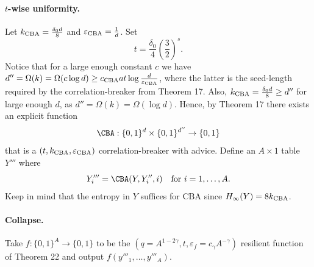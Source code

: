 \paragraph{$t$-wise uniformity.} Let $k_{\rm CBA}=\frac{\delta_0d}8$ and $\varepsilon_{\rm CBA}=\frac1d$. Set
\[t=\frac{\delta_0}4\left(\frac32\right)^s.\]
Notice that for a large enough constant $c$ we have $d''=\Omega(k)=\Omega(c\log d)\ge c_{\rm CBA}at\log\frac d{\varepsilon_{\rm CBA}}$, where the latter is the seed-length required by the correlation-breaker from Theorem 17. Also, $k_{\rm CBA}=\frac{\delta_0d}8\ge d''$ for large enough $d$, as $d''=\Omega(k)=\Omega(\log d)$. Hence, by Theorem 17 there exists an explicit function
\[\CBA:\{0,1\}^d\times\{0,1\}^{d''}\to\{0,1\}\]
that is a $(t,k_{\rm CBA},\varepsilon_{\rm CBA})$ correlation-breaker with advice.
Define an $A\times1$ table $Y'''$ where
\[Y'''_i=\CBA(Y,Y''_i,i)\quad\text{for }i=1,\ldots,A.\]
Keep in mind that the entropy in $Y$ suffices for CBA since $H_\infty(Y)=8k_{\rm CBA}$.
\paragraph{Collapse.} Take $f:\{0,1\}^A\to\{0,1\}$ to be the $(q=A^{1-2\gamma},t,\varepsilon_f=c_\gamma A^{-\gamma})$ resilient function of Theorem 22 and output $f(y'''_1,\ldots,y'''_A)$.
